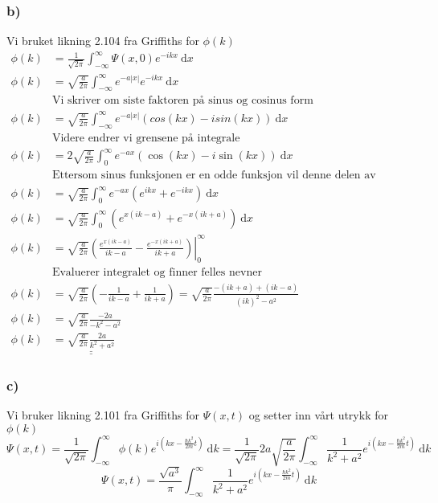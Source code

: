 \documentclass{article}
\begin{document}
\subsubsection*{b)} 
Vi bruket likning 2.104 fra Griffiths for $ϕ(k)$
\begin{align*}
ϕ(k) &= \frac{1}{\sqrt{2π}} ∫_{-∞}^{∞} Ψ(x,0)e^{-ikx} \ \mathrm{d}x
\\
ϕ(k) &= \sqrt{\frac{a}{2π}} ∫_{-∞}^{∞} e^{-a\left|x\right|} e^{- ikx}  \ \mathrm{d}x
\\
&\text{Vi skriver om siste faktoren på sinus og cosinus form}\\
ϕ(k) &= \sqrt{\frac{a}{2π}} ∫_{-∞}^{∞} e^{-a\left|x\right|} \left(cos(kx) - i sin(kx)\right) \ \mathrm{d}x
\\
&\text{Videre endrer vi grensene på integrale
}\\
ϕ(k) &= 2\sqrt{\frac{a}{2π}} ∫_{0}^{∞} e^{-ax}\left(\cos(kx) - i \sin(kx)\right) \ \mathrm{d}x
\\
&\text{Ettersom sinus funksjonen er en odde funksjon vil denne delen av integralet forsvinne. Cosinus leddet skriver vi om til eksponensial form}\\
ϕ(k) &= \sqrt{\frac{a}{2π}} ∫_{0}^{∞} e^{-ax} \left(e^{ikx} + e^{-ikx}\right) \ \mathrm{d}x
\\
ϕ(k) &= \sqrt{\frac{a}{2π}} ∫_{0}^{∞} \left(e^{x(ik - a)} + e^{-x(ik + a)}\right) \ \mathrm{d}x
\\
ϕ(k) &= \sqrt{\frac{a}{2π}} \left(\left.\frac{e^{x(ik-a)}}{ik - a} - \frac{e^{-x(ik+a)}}{ik + a}\right)\right\rvert_{0}^{∞}
\\
&\text{Evaluerer integralet og finner felles nevner}\\
ϕ(k) &= \sqrt{\frac{a}{2π}} \left(-\frac{1}{ik-a} + \frac{1}{ik+a}\right) = \sqrt{\frac{a}{2π}} \frac{-(ik+a) + (ik-a)}{(ik)^2 - a^2}
\\
ϕ(k) &= \sqrt{\frac{a}{2π}} \frac{-2a}{-k^2 - a^2}\\
ϕ(k) &= \underline{\underline{\sqrt{\frac{a}{2π}} \frac{2a}{k^2 + a^2}}}
\end{align*}


\subsubsection*{c)}
Vi bruker likning 2.101 fra Griffiths for $Ψ(x,t)$ og setter inn vårt utrykk for $ϕ(k)$
\[
Ψ(x,t) = \frac{1}{\sqrt{2π}} ∫_{-∞}^{∞} ϕ(k) e^{i \left(kx - \frac{ℏk^2}{2m}t\right)} \ \mathrm{d}k = \frac{1}{\sqrt{2π}} 2a\sqrt{\frac{a}{2π}} ∫_{-∞}^{∞} \frac{1}{k^2 + a^2} e^{i\left(kx - \frac{ℏk^2}{2m}t\right)} \ \mathrm{d}k
\]
\[
Ψ(x,t) = \frac{\sqrt{a^{3}}}{π} ∫_{-∞}^{∞} \frac{1}{k^2+a^2} e^{i\left(kx - \frac{ℏk^2}{2m}t\right)} \ \mathrm{d}k
\]
\end{document}
